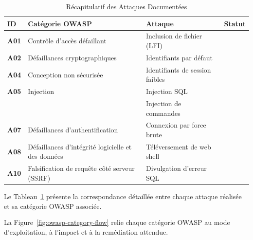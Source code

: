 \documentclass[12pt,a4paper,openany]{report}
\begin{document}
	\begin{table}[H]
		\centering
		\small
		\renewcommand{\arraystretch}{1.3}
		\begin{tabular}{>{\centering\arraybackslash}p{1.5cm} p{4cm} p{5cm} >{\centering\arraybackslash}p{1.8cm}}
			\hline
			\rowcolor{tableheadbg}
			\textcolor{tableheadfg}{\textbf{ID}} &
			\textcolor{tableheadfg}{\textbf{Catégorie OWASP}} &
			\textcolor{tableheadfg}{\textbf{Attaque}} &
			\textcolor{tableheadfg}{\textbf{Statut}} \\
			\hline
			\rowcolor{tablerowalt}
			\textbf{A01} & Contrôle d'accès défaillant & Inclusion de fichier (LFI) & \checkmark \\
			
			\textbf{A02} & Défaillances cryptographiques & Identifiants par défaut & \checkmark \\
			
			\rowcolor{tablerowalt}
			\textbf{A04} & Conception non sécurisée & Identifiants de session faibles & \checkmark \\
			
			\textbf{A05} & Injection & Injection SQL & \checkmark \\
			
			\rowcolor{tablerowalt}
			& & Injection de commandes & \checkmark \\
			
			\textbf{A07} & Défaillances d'authentification & Connexion par force brute & \checkmark \\
			
			\rowcolor{tablerowalt}
			\textbf{A08} & Défaillances d'intégrité logicielle et des données & Téléversement de web shell & \checkmark \\
			
			\textbf{A10} & Falsification de requête côté serveur (SSRF) & Divulgation d'erreur SQL & \checkmark \\
			\hline
		\end{tabular}
		\caption{Récapitulatif des Attaques Documentées}
		\label{tab:attack-summary}
	\end{table}
	Le Tableau~\ref{tab:attack-summary} présente la correspondance détaillée entre chaque attaque réalisée et sa catégorie OWASP associée.
	
	La Figure~\ref{fig:owasp-category-flow} relie chaque catégorie OWASP au mode d'exploitation, à l'impact et à la remédiation attendue.
	
\end{document}
